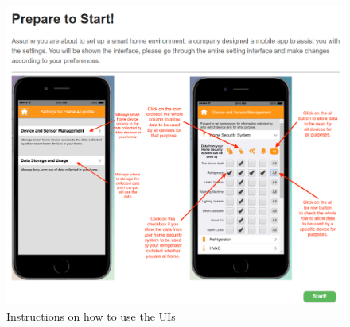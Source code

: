 \begin{figure}
	\centering
	\includegraphics[width=\textwidth]{figures/yangPrepage.png}
	\caption{Instructions on how to use the UIs}
	\label{fig:yangPrepage}
\end{figure}



    

   





    
    
